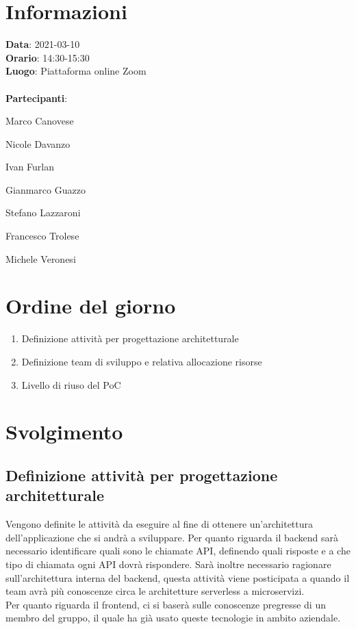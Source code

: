 \section{Informazioni}
\textbf{Data}: 2021-03-10 \\
\textbf{Orario}: 14:30-15:30 \\
\textbf{Luogo}: Piattaforma online Zoom \\\\
\textbf{Partecipanti}:\begin{list}{*}{\setlength{\itemsep}{0cm}}
	\item Marco Canovese
	\item Nicole Davanzo
	\item Ivan Furlan
	\item Gianmarco Guazzo
	\item Stefano Lazzaroni
	\item Francesco Trolese
	\item Michele Veronesi
\end{list}

\section{Ordine del giorno}
\begin{enumerate}
	\item Definizione attività per progettazione architetturale
	\item Definizione team di sviluppo e relativa allocazione risorse
	\item Livello di riuso del PoC
\end{enumerate}

\section{Svolgimento}
\subsection{Definizione attività per progettazione architetturale}
Vengono definite le attività da eseguire al fine di ottenere un'architettura dell'applicazione che si andrà a sviluppare.
Per quanto riguarda il backend sarà necessario identificare quali sono le chiamate API, definendo quali risposte e a che tipo di chiamata
ogni API dovrà rispondere. Sarà inoltre necessario ragionare sull'architettura interna del backend, questa attività viene posticipata a quando il team
avrà più conoscenze circa le architetture serverless a microservizi.\\
Per quanto riguarda il frontend, ci si baserà sulle conoscenze pregresse di un membro del gruppo, il quale ha già usato queste tecnologie in ambito aziendale.

